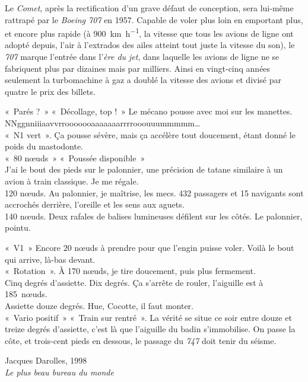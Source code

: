 Le \textit{Comet}, après la rectification d’un grave défaut de conception, sera lui-même rattrapé par le \textit{Boeing 707} en 1957. Capable de voler plus loin en emportant plus, et encore plus rapide (à \SI[per-mode=symbol]{900}{\kilo\metre\per\hour}, la vitesse que tous les avions de ligne ont adopté depuis, l’air à l’extrados des ailes atteint tout juste la vitesse du son), le \textit{707} marque l’entrée dans l’\textit{ère du jet}, dans laquelle les avions de ligne ne se fabriquent plus par dizaines mais par milliers. Ainsi en vingt-cinq années seulement la turbomachine à gaz a doublé la vitesse des avions et divisé par quatre le prix des billets.


	\onlyframabook{\begin{quote}}
	\onlyamphibook{\begin{historyquote}}
	\begin{footnotesize}
		«~Parés ?~» «~Décollage, top !~» Le mécano pousse avec moi sur les manettes.\\
		NNggnniiiaavvrrooooooaaaaaaarrrrooouuummmmm…\\
		«~N1 vert~». Ça pousse sévère, mais ça accélère tout doucement, étant donné le poids du mastodonte.\\
		«~80 nœuds~» «~Poussée disponible~»\\
		J’ai le bout des pieds sur le palonnier, une précision de tatane similaire à un avion à train classique. Je me régale.\\
		120 nœuds. Au palonnier, je maîtrise, les mecs. 432 passagers et 15 navigants sont accrochés derrière, l’oreille et les sens aux aguets.\\
		140 nœuds. Deux rafales de balises lumineuses défilent sur les côtés. Le palonnier, pointu.
		
		«~V1~» Encore 20 nœuds à prendre pour que l'engin puisse voler. Voilà le bout qui arrive, là-bas devant.\\
		«~Rotation~». À 170 nœuds, je tire doucement, puis plus fermement.\\
		Cinq degrés d'assiette. Dix degrés. Ça s’arrête de rouler, l’aiguille est à 185~nœuds.\\
		Assiette douze degrés. Hue, Cocotte, il faut monter.\\
		«~Vario positif~» «~Train sur rentré~». La vérité se situe ce soir entre douze et treize degrés d’assiette, c'est là que l'aiguille du badin s'immobilise. On passe la côte, et trois-cent pieds en dessous, le passage du \textit{747} doit tenir du séisme.
			\begin{flushright}\vspace{-0.5em}Jacques Darolles, 1998\\ \textit{Le plus beau bureau du monde}~\cite{darolles2000}\end{flushright}
	\end{footnotesize}
	\onlyamphibook{\end{historyquote}}
	\onlyframabook{\end{quote}}

